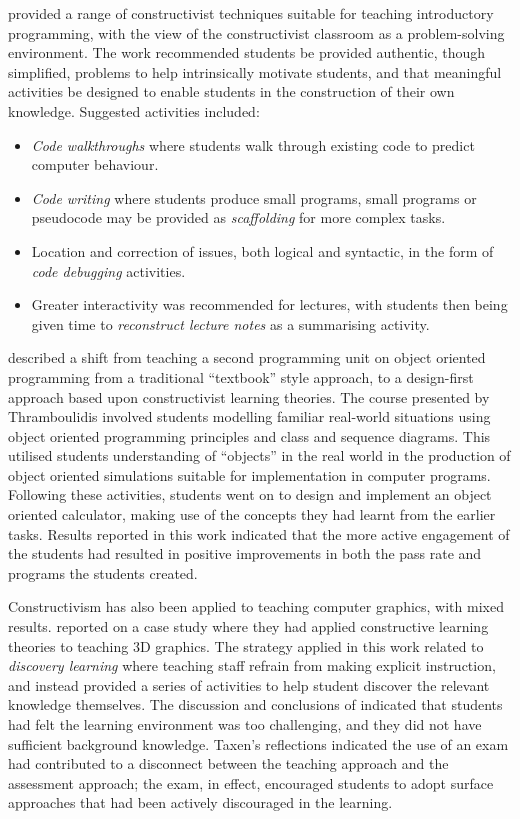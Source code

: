 \citet{VanGorp:2001} provided a range of constructivist techniques suitable for teaching introductory programming, with the view of the constructivist classroom as a problem-solving environment. The work recommended students be provided authentic, though simplified, problems to help intrinsically motivate students, and that meaningful activities be designed to enable students in the construction of their own knowledge. Suggested activities included:

\begin{itemize}[noitemsep,nolistsep]
	\item \emph{Code walkthroughs} where students walk through existing code to predict computer behaviour.
	\item \emph{Code writing} where students produce small programs, small programs or pseudocode may be provided as \emph{scaffolding} for more complex tasks. 
	\item Location and correction of issues, both logical and syntactic, in the form of \emph{code debugging} activities.
	\item Greater interactivity was recommended for lectures, with students then being given time to \emph{reconstruct lecture notes} as a summarising activity. 
\end{itemize}


\citet{Thramboulidis:2003,Thramboulidis:2003a,Thramboulidis:2003b} described a shift from teaching a second programming unit on object oriented programming from a traditional ``textbook'' style approach, to a design-first approach based upon constructivist learning theories. The course presented by Thramboulidis involved students modelling familiar real-world situations using object oriented programming principles and class and sequence diagrams. This utilised students understanding of ``objects'' in the real world in the production of object oriented simulations suitable for implementation in computer programs. Following these activities, students went on to design and implement an object oriented calculator, making use of the concepts they had learnt from the earlier tasks. Results reported in this work indicated that the more active engagement of the students had resulted in positive improvements in both the pass rate and programs the students created. 

Constructivism has also been applied to teaching computer graphics, with mixed results. \citet{Taxen:2004} reported on a case study where they had applied constructive learning theories to teaching 3D graphics. The strategy applied in this work related to \emph{discovery learning} \cite{Duffy:1996} where teaching staff refrain from making explicit instruction, and instead provided a series of activities to help student discover the relevant knowledge themselves. The discussion and conclusions of \citet{Taxen:2004} indicated that students had felt the learning environment was too challenging, and they did not have sufficient background knowledge. Taxen's reflections indicated the use of an exam had contributed to a disconnect between the teaching approach and the assessment approach; the exam, in effect, encouraged students to adopt surface approaches that had been actively discouraged in the learning.


